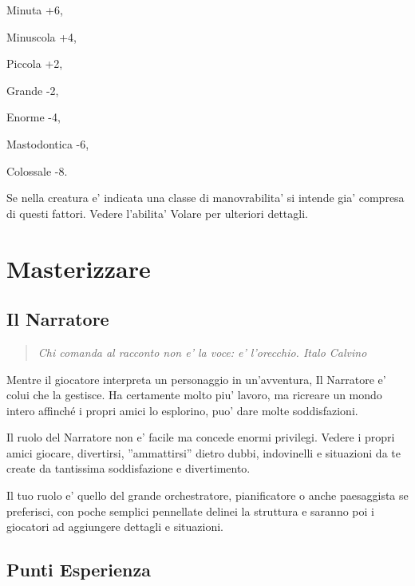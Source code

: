 \documentclass[a4paper,11pt,twoside,openany]{book}
\begin{document}
{Minuta +6,

Minuscola +4,

Piccola +2,

Grande -2,

Enorme -4,

Mastodontica -6,

Colossale -8.

Se nella creatura e' indicata una classe di manovrabilita' si intende gia' compresa di questi fattori. Vedere l'abilita' Volare per ulteriori dettagli.

\pagebreak

\section{Masterizzare}

\label{masterizzare}


\subsection{Il Narratore}

\begin{quote}\textit{
{Chi comanda al racconto non e' la voce: e' l'orecchio. Italo Calvino}
}\end{quote}


\label{il-narratore}

Mentre il giocatore interpreta un personaggio in un'avventura, Il Narratore e' colui che la gestisce. Ha certamente molto piu' lavoro, ma ricreare un mondo intero affinché i propri amici lo esplorino, puo' dare molte soddisfazioni.

Il ruolo del Narratore non e' facile ma concede enormi privilegi. Vedere i propri amici giocare, divertirsi, ''ammattirsi'' dietro dubbi, indovinelli e situazioni da te create da tantissima soddisfazione e divertimento.

Il tuo ruolo e' quello del grande orchestratore, pianificatore o anche paesaggista se preferisci, con poche semplici pennellate delinei la struttura e saranno poi i giocatori ad aggiungere dettagli e situazioni.



\subsection{Punti Esperienza}

\label{punti-esperienza}

}
\end{document}
